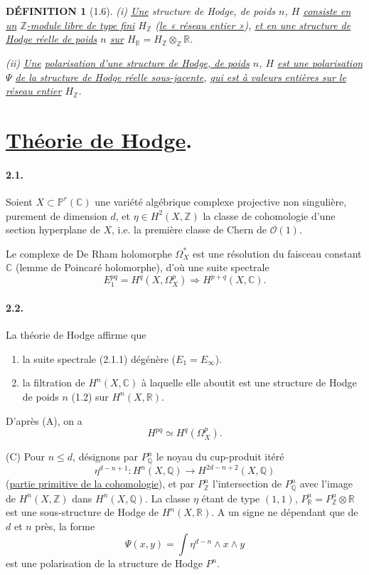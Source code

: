 \documentclass[10pt,leqno]{article}
\newcommand{\C}{\mathbb C}
\newcommand{\R}{\mathbb R}
\newcommand{\Z}{\mathbb Z}
\newcommand{\Q}{\mathbb Q}
\newcommand{\Pj}{\mathbb P}
\newcommand{\cO}{\mathcal O}
\theoremstyle{deligne}
\newtheorem*{definition}{DÉFINITION}
\renewcommand{\underline}[1]{\uline{#1}}
\begin{document}
\begin{definition}[1.6]
(i) \underline{Une} structure de Hodge, de poids $n$, $H$ \underline{consiste en un} $\Z$\underline{-module libre de type fini} $H_\Z$ (\underline{le « réseau entier »}), \underline{et en une structure de Hodge réelle de poids} $n$ \underline{sur} $H_\R=H_\Z\otimes_\Z\R$.

(ii) \underline{Une} \underline{polarisation d'une structure de Hodge, de poids} $n$, $H$ \underline{est une polarisation} $\Psi$ \underline{de la structure de Hodge réelle sous-jacente}, \underline{qui est à valeurs entières sur le réseau entier} $H_\Z$.
\end{definition}

\section{\underline{Théorie de Hodge}.}

\paragraph{2.1.}
Soient $X\subset\Pj^r(\C)$ une variété algébrique complexe projective non singulière, purement de dimension $d$, et $\eta\in H^2(X,\Z)$ la classe de cohomologie d'une section hyperplane de $X$, i.e. la première classe de Chern de $\cO(1)$.

Le complexe de De Rham holomorphe $\Omega_X^*$ est une résolution du faisceau constant $\C$ (lemme de Poincaré holomorphe), d'où une suite spectrale
\begin{equation}
E_1^{pq}=H^q(X,\Omega_X^p)\Rightarrow H^{p+q}(X,\C).
\tag{2.1.1}
\end{equation}

\paragraph{2.2.}
La théorie de Hodge affirme que
\begin{enumerate}[label=(\Alph*)]
\item la suite spectrale (2.1.1) dégénère ($E_1=E_\infty$).
\item la filtration de $H^n(X,\C)$ à laquelle elle aboutit est une structure de Hodge de poids $n$ (1.2) sur $H^n(X,\R)$.
\end{enumerate}
D'après (A), on a
\[
H^{pq}\simeq H^q(\Omega_X^p).
\]

(C) Pour $n\le d$, désignons par $P_\Q^n$ le noyau du cup-produit itéré
\[
\eta^{d-n+1}:H^n(X,\Q)\longrightarrow H^{2d-n+2}(X,\Q)
\]
(\underline{partie primitive de la cohomologie}), et par $P_\Z^n$ l'intersection de $P_\Q^n$ avec l'image de $H^n(X,\Z)$ dans $H^n(X,\Q)$. La classe $\eta$ étant de type $(1,1)$, $P_\R^n=P_\Z^n\otimes\R$ est une sous-structure de Hodge de $H^n(X,\R)$. A un signe ne dépendant que de $d$ et $n$ près, la forme
\[
\Psi(x,y)=\int \eta^{d-n}\wedge x\wedge y
\]
est une polarisation de la structure de Hodge $P^n$.
\end{document}
